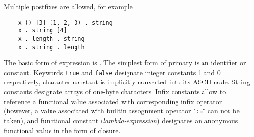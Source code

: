 Multiple postfixes are allowed, for example

\begin{lstlisting}
    x () [3] (1, 2, 3) . string
    x . string [4]
    x . length . string
    x . string . length
\end{lstlisting}

The basic form of expression is . The simplest form of primary is an identifier or constant. Keywords \lstinline|true| and \lstinline|false|
designate integer constants 1 and 0 respectively, character constant is implicitly converted into its ASCII code.  String constants designate arrays
of one-byte characters. Infix constants allow to reference a functional value associated with corresponding infix operator (however, a value associated with
builtin assognment operator "\lstinline|:=|" can not be taken), and functional constant (\emph{lambda-expression})
designates an anonymous functional value in the form of closure. 

